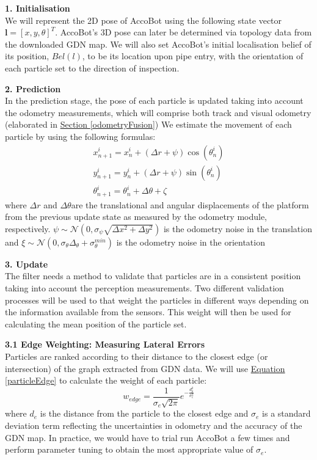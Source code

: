 \documentclass[11pt]{article}		%
\newcommand{\equationref}[1]{\hyperref[#1]{Equation \ref*{#1}}}     %
\newcommand{\sectref}[1]{\hyperref[#1]{Section \ref*{#1}}}     %
\begin{document}
	    \textbf{1. Initialisation}
	    \\We will represent the 2D pose of AccoBot using the following state vector $\boldsymbol{l}=[x,  y,\theta]^{T}$. AccoBot's 3D pose can later be determined via topology data from the downloaded GDN map. We will also set AccoBot's initial localisation belief of its position, $Bel(l)$, to be its location upon pipe entry, with the orientation of each particle set to the direction of inspection. 
	    
	    \textbf{2. Prediction}
	    \\In the prediction stage, the pose of each particle is updated taking into account the odometry measurements, which will comprise both track and visual odometry (elaborated in \sectref{odometryFusion}) We estimate the movement of each particle by using the following formulas:
	    \begin{equation}
\begin{array}{l}
x_{n+1}^{i}=x_{n}^{i}+(\Delta r+\psi) \cos \left(\theta_{n}^{i}\right) \\
y_{n+1}^{i}=y_{n}^{i}+(\Delta r+\psi) \sin \left(\theta_{n}^{i}\right) \\
\theta_{n+1}^{i}=\theta_{n}^{i}+\Delta \theta+\zeta
\end{array}
\end{equation}\label{47}
    where $\Delta r$ and $\Delta \theta$are the translational and angular displacements of the platform from the previous
    update state as measured by the odometry module, respectively. $\psi \sim \mathcal{N}\left(0, \sigma_{\psi} \sqrt{\Delta x^{2}+\Delta y^{2}}\right)$ is the odometry noise in the translation and $\xi \sim \mathcal{N}\left(0, \sigma_{\theta} \Delta_{\theta}+\sigma_{\theta}^{m i n}\right)$ is the odometry noise in the orientation
	
	\textbf{3. Update}
	\\The filter needs a method to validate that particles are in a consistent position taking into account the perception measurements. Two different validation processes will be used to that weight the particles in different ways depending on the information available from the sensors.
    This weight will then be used for calculating the mean position of the particle set.
    
    \textbf{3.1 Edge Weighting: Measuring Lateral Errors}
    \\Particles are ranked according to their distance to the closest edge (or intersection) of the graph extracted from GDN data. We will use \equationref{particleEdge} to calculate the weight of each particle:
    \begin{equation}
w_{e d g e}=\frac{1}{\sigma_{e} \sqrt{2 \pi}} e^{-\frac{d_{p}^{2}}{\sigma_{e}^{2}}} \label{particleEdge}
\end{equation}
    where $d_e$ is the distance from the particle to the closest edge and $\sigma_e$ is a standard deviation term reflecting the uncertainties in odometry and the accuracy of the GDN map. In practice, we would have to trial run AccoBot a few times and perform parameter tuning to obtain the most appropriate value of $\sigma_e$.
    
\end{document}
